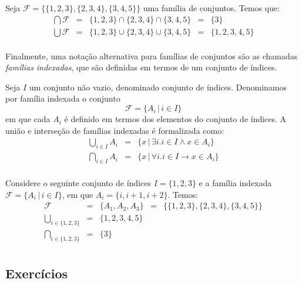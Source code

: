 \begin{Example}
Seja $\mathcal{F}=\{\{1,2,3\},\{2,3,4\},\{3,4,5\}\}$ uma família de
conjuntos. Temos que:
\[
\begin{array}{lclcl}
\bigcap\mathcal{F} & = & \{1,2,3\}\cap\{2,3,4\}\cap\{3,4,5\} & = &
\{3\}\\
\bigcup\mathcal{F} & = & \{1,2,3\}\cup\{2,3,4\}\cup\{3,4,5\} & = & \{1,2,3,4,5\}\\
\end{array}
\]
\end{Example}

Finalmente, uma notação alternativa para famílias de conjuntos são as
chamadas \emph{famílias indexadas}, que são definidas em termos de um
conjunto de índices.

\begin{Definition}
Seja $I$ um conjunto não vazio, denominado conjunto de
índices. Denominamos por família indexada o conjunto
\[\mathcal{F}=\{A_i\,|\,i\in I\}\]
em que cada $A_i$ é definido em termos dos elementos do conjunto de
índices. A união e interseção de famílias indexadas é formalizada
como:
\[
\begin{array}{lcl}
\bigcup_{i\in I} A_i & = & \{x\,|\,\exists i. i\in I \land x\in
A_i\}\\
\bigcap_{i\in I} A_i & = & \{x\,|\,\forall i. i\in I \to x\in A_i\}\\
\end{array}
\]
\end{Definition}

\begin{Example}
Considere o seguinte conjunto de índices $I = \{1,2,3\}$ e a família
indexada $\mathcal{F}=\{A_i\,|\,i\in I\}$, em que
$A_i=\{i,i+1,i+2\}$. Temos:
\[
\begin{array}{lclcl}
\mathcal{F} & = & \{A_1,A_2,A_3\} & = &
\{\{1,2,3\},\{2,3,4\},\{3,4,5\}\}\\
\bigcup_{i\in\{1,2,3\}} & = & \{1,2,3,4,5\} \\
\bigcap_{i\in\{1,2,3\}} & = & \{3\} \\
\end{array}
\]
\end{Example}

\subsection{Exercícios}

